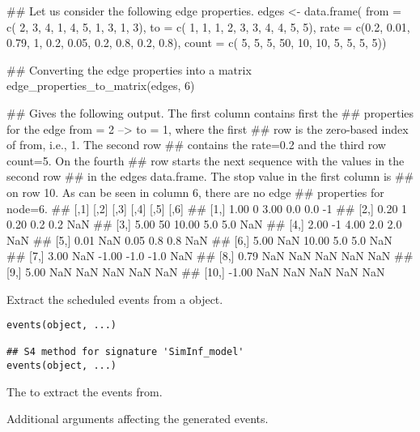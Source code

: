 \documentclass[letterpaper]{book}
\begin{document}
\begin{Examples}
\begin{ExampleCode}
## Let us consider the following edge properties.
edges <- data.frame(
    from  = c(  2,    3,     4,  1,   4,    5,   1,   3,   1,   3),
    to    = c(  1,    1,     1,  2,   3,    3,   4,   4,   5,   5),
    rate  = c(0.2, 0.01,  0.79,  1, 0.2, 0.05, 0.2, 0.8, 0.2, 0.8),
    count = c(  5,    5,     5, 50,  10,   10,   5,   5,   5,   5))

## Converting the edge properties into a matrix
edge_properties_to_matrix(edges, 6)

## Gives the following output. The first column contains first the
## properties for the edge from = 2 --> to = 1, where the first
## row is the zero-based index of from, i.e., 1. The second row
## contains the rate=0.2 and the third row count=5. On the fourth
## row starts the next sequence with the values in the second row
## in the edges data.frame. The stop value in the first column is
## on row 10. As can be seen in column 6, there are no edge
## properties for node=6.
##        [,1] [,2]  [,3] [,4] [,5] [,6]
##  [1,]  1.00    0  3.00  0.0  0.0   -1
##  [2,]  0.20    1  0.20  0.2  0.2  NaN
##  [3,]  5.00   50 10.00  5.0  5.0  NaN
##  [4,]  2.00   -1  4.00  2.0  2.0  NaN
##  [5,]  0.01  NaN  0.05  0.8  0.8  NaN
##  [6,]  5.00  NaN 10.00  5.0  5.0  NaN
##  [7,]  3.00  NaN -1.00 -1.0 -1.0  NaN
##  [8,]  0.79  NaN   NaN  NaN  NaN  NaN
##  [9,]  5.00  NaN   NaN  NaN  NaN  NaN
## [10,] -1.00  NaN   NaN  NaN  NaN  NaN
\end{ExampleCode}
\end{Examples}
%
\begin{Description}
Extract the scheduled events from a  object.
\end{Description}
%
\begin{Usage}
\begin{verbatim}
events(object, ...)

## S4 method for signature 'SimInf_model'
events(object, ...)
\end{verbatim}
\end{Usage}
%
\begin{Arguments}
\begin{ldescription}
\item[\code{object}] The  to extract the events from.

\item[\code{...}] Additional arguments affecting the generated events.
\end{ldescription}
\end{Arguments}
\end{document}
